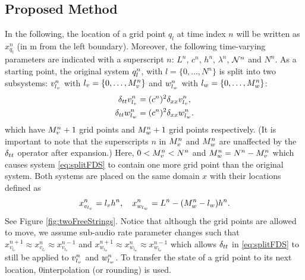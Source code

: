 \documentclass[fleqn]{jaes}
\def\SBcomment[#1]{\textcolor{red}{#1}}
\def\SWcomment[#1]{\textcolor{blue}{#1}}
\begin{document}
\subsection{Proposed Method}
In the following, the location of a grid point $q_l$ at time index $n$ will be written as $x_{q_l}^n$ (in m from the left boundary). Moreover, the following time-varying parameters are indicated with a superscript $n$: $L^n$, $c^n$, $h^n$, $\lambda^n$, $\mathcal{N}^n$ and $N^n$. %
As a starting point, the original system $q_l^n$, with $l=\{0, \hdots, N^n\}$ is split into two subsystems: $v_{l_v}^n$ with $l_v=\{0, \hdots, M_v^n\}$ and $w_{l_w}^n$ with  $l_w=\{0, \hdots, M_w^n\}$:
\begin{subequations}\label{eq:splitFDS}
    \begin{align}
        \delta_{tt} v_{l_v}^n &= (c^n)^2\delta_{xx} v_{l_v}^n,\\
        \delta_{tt} w_{l_w}^n &= (c^n)^2\delta_{xx} w_{l_w}^n.
    \end{align}
\end{subequations}
which have $M_v^n+1$ grid points and $M_w^n+1$ grid points respectively. (It is important to note that the superscripts $n$ in $M_v^n$ and $M_w^n$ are unaffected by the $\delta_{tt}$ operator after expansion.) Here, $0<M_v^n<N^n$ and $M_w^n = N^n - M_v^n$ which causes system \eqref{eq:splitFDS} to contain one more grid point than the original system. Both systems are placed on the same domain $x$ with their locations defined as
\begin{equation}\label{eq:gridLocations}
    x_{v_\lv}^n =\lv h^n, \quad x_{w_\lw}^n = L^n-(\Mw-\lw)h^n.
\end{equation}
% 
See Figure \ref{fig:twoFreeStrings}. Notice that although the grid points are allowed to move, we assume sub-audio rate parameter changes such that $x^{n+1}_{v_{l_v}} \approx x^{n}_{v_{l_v}}  \approx x^{n-1}_{v_{l_v}}$ and $x^{n+1}_{w_{l_w}} \approx x^{n}_{w_{l_w}}  \approx x^{n-1}_{w_{l_w}}$ which allows $\delta_{tt}$ in \eqref{eq:splitFDS} to still be applied to $v_{l_v}^n$ and $w_{l_w}^n$. To transfer the state of a grid point to its next location, $0$\thOrder interpolation (or rounding) is used. 
\end{document}
